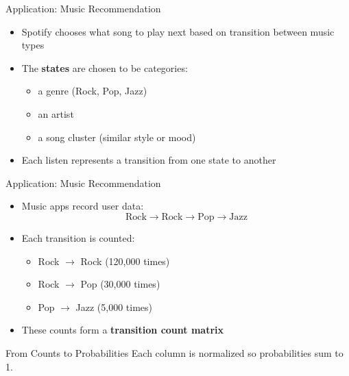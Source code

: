 \documentclass[10pt]{beamer}
\begin{document}
\begin{frame}{Application: Music Recommendation}

\begin{itemize}
    \item Spotify chooses what song to play next based on transition between music types
    \item The \textbf{states} are chosen to be categories:
    \begin{itemize}
        \item a genre (Rock, Pop, Jazz)
        \item an artist
        \item a song cluster (similar style or mood)
    \end{itemize}
    \item Each listen represents a transition from one state to another
\end{itemize}

\end{frame}


\begin{frame}{Application: Music Recommendation}

\begin{itemize}
    \item Music apps record user data:
    \[
    \text{Rock} \rightarrow \text{Rock} \rightarrow \text{Pop} \rightarrow \text{Jazz}
    \]
    \item Each transition is counted:
    \begin{itemize}
        \item Rock $\to$ Rock (120,000 times)
        \item Rock $\to$ Pop (30,000 times)
        \item Pop $\to$ Jazz (5,000 times)
    \end{itemize}
    \item These counts form a \textbf{transition count matrix}
\end{itemize}

\vspace{2mm}
\begin{block}{From Counts to Probabilities}
Each column is normalized so probabilities sum to 1.
\end{block}

\end{frame}
\end{document}
